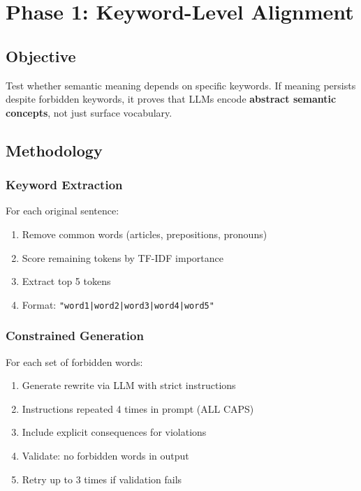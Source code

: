 \documentclass[12pt,a4paper]{report}
\begin{document}
\newpage

\chapter{Phase 1: Keyword-Level Alignment}

\section{Objective}

Test whether semantic meaning depends on specific keywords. If meaning persists despite forbidden keywords, it proves that LLMs encode \textbf{abstract semantic concepts}, not just surface vocabulary.

\section{Methodology}

\subsection{Keyword Extraction}

For each original sentence:
\begin{enumerate}
    \item Remove common words (articles, prepositions, pronouns)
    \item Score remaining tokens by TF-IDF importance
    \item Extract top 5 tokens
    \item Format: \texttt{"word1|word2|word3|word4|word5"}
\end{enumerate}

\subsection{Constrained Generation}

For each set of forbidden words:
\begin{enumerate}
    \item Generate rewrite via LLM with strict instructions
    \item Instructions repeated 4 times in prompt (ALL CAPS)
    \item Include explicit consequences for violations
    \item Validate: no forbidden words in output
    \item Retry up to 3 times if validation fails
\end{enumerate}
\end{document}
